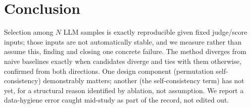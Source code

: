 \documentclass{article}
\begin{document}
\section{Conclusion}

Selection among $N$ LLM samples is exactly reproducible given fixed
judge/score inputs; those inputs are not automatically stable, and we
measure rather than assume this, finding and closing one concrete
failure. The method diverges from naive baselines exactly when
candidates diverge and ties with them otherwise, confirmed from both
directions. One design component (permutation self-consistency)
demonstrably matters; another (the self-consistency term) has not yet,
for a structural reason identified by ablation, not assumption. We
report a data-hygiene error caught mid-study as part of the record, not
edited out.



\end{document}
